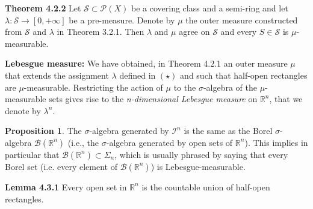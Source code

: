 \documentclass[a4paper,14pt]{extarticle}
\theoremstyle{definition}
\newtheorem{proposition}{Proposition}
\begin{document}
\vspace{12pt}

\noindent\textbf{Theorem 4.2.2} Let $\mathcal{S}\subset\mathcal{P}(X)$ be a covering class and a semi-ring and let $\lambda:\mathcal{S}\rightarrow[0,+\infty]$ be a pre-measure. Denote by $\mu$ the outer measure constructed from $\mathcal{S}$ and $\lambda$ in Theorem 3.2.1. Then $\lambda$ and $\mu$ agree on $\mathcal{S}$ and every $S\in\mathcal{S}$ is $\mu$-measurable.

\vspace{12pt}

\noindent\textbf{Lebesgue measure:} We have 
obtained, in Theorem 4.2.1 an outer measure $\mu$ that extends the assignment $\lambda$ 
defined in $(\star)$ and such that half-open rectangles are $\mu$-measurable. Restricting the action of $\mu$ to the $\sigma$-algebra of the 
$\mu$-measurable sets gives rise to the \textit{n-dimensional Lebesgue measure} on $\mathbb{R}^n$, that we denote by $\lambda^n$.
\begin{proposition}
  The $\sigma$-algebra generated by $\mathcal{I}^n$ is the same as the Borel $\sigma$-algebra
  $\mathcal{B}(\mathbb{R}^n)$ (i.e., the $\sigma$-algebra generated by open sets of $\mathbb{R}^n$). This implies in particular that $\mathcal{B}(\mathbb{R}^n)\subset\Sigma_n$, which is usually phrased by saying that every Borel set (i.e. every element of $\mathcal{B}(\mathbb{R}^n)$) is 
  Lebesgue-measurable.
\end{proposition}
\noindent\textbf{Lemma 4.3.1} Every open set in $\mathbb{R}^n$ is the countable union of half-open rectangles. 

\vspace{12pt}
\end{document}
